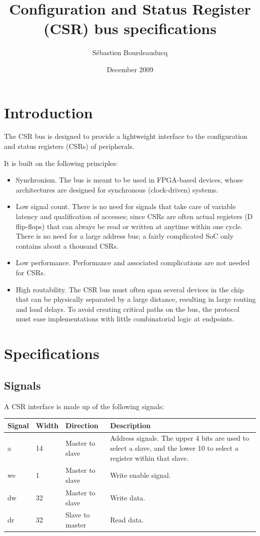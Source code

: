 \documentclass[a4paper,11pt]{article}
\title{Configuration and Status Register (CSR) bus specifications}
\author{S\'ebastien Bourdeauducq}
\date{December 2009}
\begin{document}
\setlength{\parindent}{0pt}
\setlength{\parskip}{5pt}
\maketitle{}
\section{Introduction}
The CSR bus is designed to provide a lightweight interface to the configuration and status registers (CSRs) of peripherals.

It is built on the following principles:
\begin{itemize}
\item Synchronism. The bus is meant to be used in FPGA-based devices, whose architectures are designed for synchronous (clock-driven) systems.
\item Low signal count. There is no need for signals that take care of variable latency and qualification of accesses; since CSRs are often actual registers (D flip-flops) that can always be read or written at anytime within one cycle. There is no need for a large address bus; a fairly complicated SoC only contains about a thousand CSRs.
\item Low performance. Performance and associated complications are not needed for CSRs.
\item High routability. The CSR bus must often span several devices in the chip that can be physically separated by a large distance, resulting in large routing and load delays. To avoid creating critical paths on the bus, the protocol must ease implementations with little combinatorial logic at endpoints.
\end{itemize}

\section{Specifications}
\subsection{Signals}
A CSR interface is made up of the following signals:

\begin{tabularx}{\textwidth}{|l|l|l|X|}
\hline
\bf{Signal} & \bf{Width} & \bf{Direction} & \bf{Description} \\
\hline
a & 14 & Master to slave & Address signals. The upper 4 bits are used to select a slave, and the lower 10 to select a register within that slave. \\
\hline
we & 1 & Master to slave & Write enable signal. \\
\hline
dw & 32 & Master to slave & Write data. \\
\hline
dr & 32 & Slave to master & Read data. \\
\hline
\end{tabularx}\\
\end{document}
